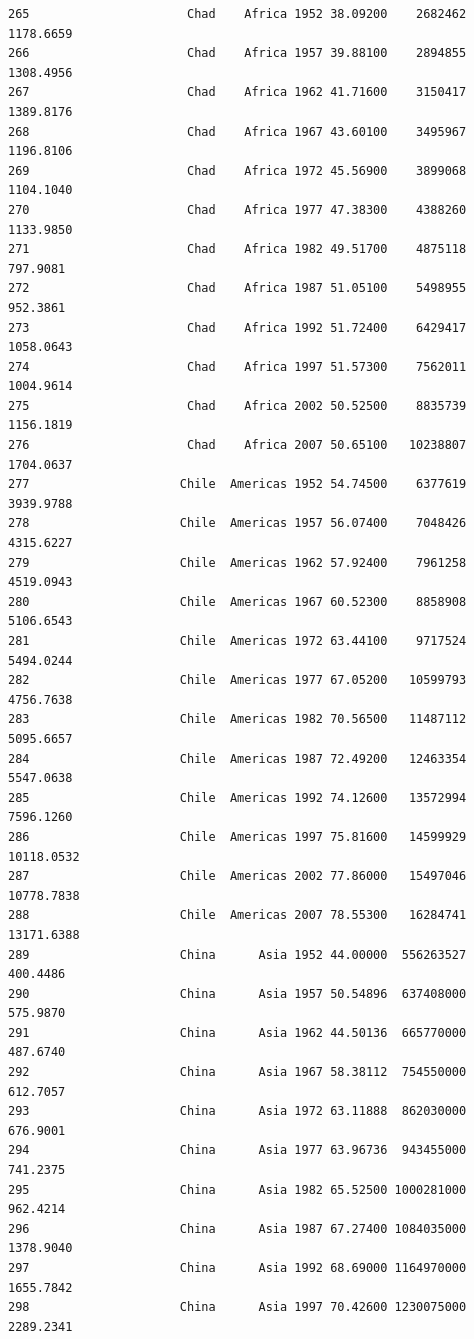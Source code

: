 \documentclass[
  letterpaper,
  DIV=11,
  numbers=noendperiod]{scrreprt}
\begin{document}
\begin{verbatim}
265                      Chad    Africa 1952 38.09200    2682462   1178.6659
266                      Chad    Africa 1957 39.88100    2894855   1308.4956
267                      Chad    Africa 1962 41.71600    3150417   1389.8176
268                      Chad    Africa 1967 43.60100    3495967   1196.8106
269                      Chad    Africa 1972 45.56900    3899068   1104.1040
270                      Chad    Africa 1977 47.38300    4388260   1133.9850
271                      Chad    Africa 1982 49.51700    4875118    797.9081
272                      Chad    Africa 1987 51.05100    5498955    952.3861
273                      Chad    Africa 1992 51.72400    6429417   1058.0643
274                      Chad    Africa 1997 51.57300    7562011   1004.9614
275                      Chad    Africa 2002 50.52500    8835739   1156.1819
276                      Chad    Africa 2007 50.65100   10238807   1704.0637
277                     Chile  Americas 1952 54.74500    6377619   3939.9788
278                     Chile  Americas 1957 56.07400    7048426   4315.6227
279                     Chile  Americas 1962 57.92400    7961258   4519.0943
280                     Chile  Americas 1967 60.52300    8858908   5106.6543
281                     Chile  Americas 1972 63.44100    9717524   5494.0244
282                     Chile  Americas 1977 67.05200   10599793   4756.7638
283                     Chile  Americas 1982 70.56500   11487112   5095.6657
284                     Chile  Americas 1987 72.49200   12463354   5547.0638
285                     Chile  Americas 1992 74.12600   13572994   7596.1260
286                     Chile  Americas 1997 75.81600   14599929  10118.0532
287                     Chile  Americas 2002 77.86000   15497046  10778.7838
288                     Chile  Americas 2007 78.55300   16284741  13171.6388
289                     China      Asia 1952 44.00000  556263527    400.4486
290                     China      Asia 1957 50.54896  637408000    575.9870
291                     China      Asia 1962 44.50136  665770000    487.6740
292                     China      Asia 1967 58.38112  754550000    612.7057
293                     China      Asia 1972 63.11888  862030000    676.9001
294                     China      Asia 1977 63.96736  943455000    741.2375
295                     China      Asia 1982 65.52500 1000281000    962.4214
296                     China      Asia 1987 67.27400 1084035000   1378.9040
297                     China      Asia 1992 68.69000 1164970000   1655.7842
298                     China      Asia 1997 70.42600 1230075000   2289.2341

\end{verbatim}
\end{document}
